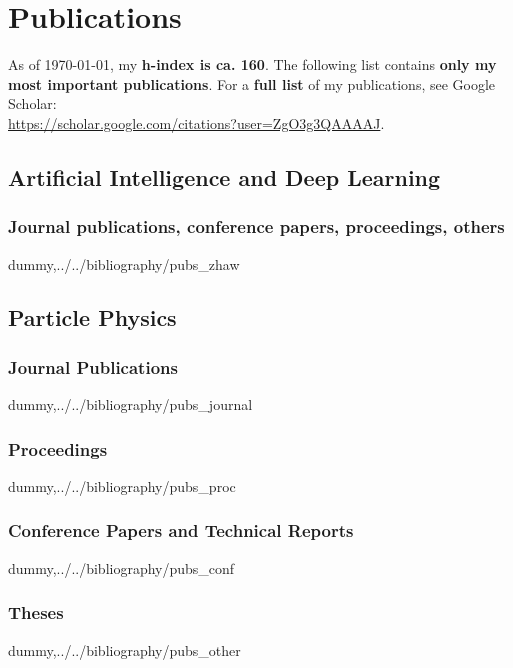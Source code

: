 \documentclass[10pt,twoside,a4paper]{report}
\begin{document}



\nocite{*}

\chapter*{Publications}

\noindent
As of \mydate \today, my {\bf h-index is ca. 160}. The following list contains {\bf only my most important publications}. For a {\bf full list} of my publications, see Google Scholar: \\
\href{https://scholar.google.com/citations?user=ZgO3g3QAAAAJ}{https://scholar.google.com/citations?user=ZgO3g3QAAAAJ}. 

\section*{Artificial Intelligence and Deep Learning}

\subsection*{Journal publications, conference papers, proceedings, others} 

\begin{btSect}{dummy,../../bibliography/pubs_zhaw}
	\btPrintNotCited
\end{btSect}

\section*{Particle Physics}

\subsection*{Journal Publications}

\begin{btSect}{dummy,../../bibliography/pubs_journal}
	\btPrintNotCited
\end{btSect}

\subsection*{Proceedings}

\begin{btSect}{dummy,../../bibliography/pubs_proc}
	\btPrintNotCited
\end{btSect}

\subsection*{Conference Papers and Technical Reports}

\begin{btSect}{dummy,../../bibliography/pubs_conf}
	\btPrintNotCited
\end{btSect}

\subsection*{Theses}

\begin{btSect}{dummy,../../bibliography/pubs_other}
	\btPrintNotCited
\end{btSect}
\end{document}
